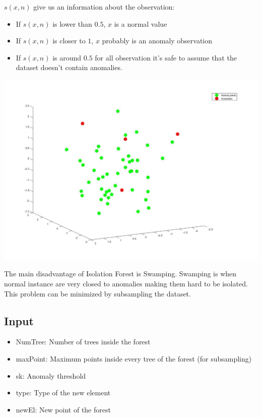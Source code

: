 \documentclass[journal]{IEEEtran}
\begin{document}
$s(x,n)$ give us an information about the observation:
\begin{itemize}
\item If $s(x,n)$ is lower than $0.5$, $x$ is a normal value
\item If $s(x,n)$ is closer to $1$, $x$ probably is an anomaly observation
\item If $s(x,n)$ is around $0.5$ for all observation it's safe to assume that the dataset doesn't contain anomalies.
\end{itemize}

\begin{center}
\includegraphics[width=\columnwidth]{grafico.jpg}
\end{center}

The main disadvantage of Isolation Forest is Swamping. Swamping is when normal instance are very closed to anomalies making them hard to be isolated. This problem can be minimized by subsampling the dataset.

\subsection{Input}
\begin{itemize}
\item NumTree: Number of trees inside the forest 
\item maxPoint: Maximum points inside every tree of the forest (for subsampling)
\item sk: Anomaly threshold 
\item type: Type of the new element 
\item newEl: New point of the forest 
\end{itemize}
\end{document}

